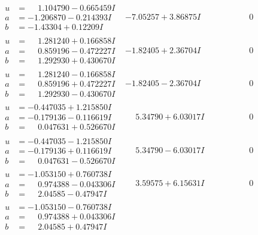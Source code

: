 \documentclass[1p]{elsarticle_modified}
\theoremstyle{definition}
\begin{document}
$$\begin{array}{c|c|c}
\begin{aligned}
u &= \phantom{-}1.104790 - 0.665459 I \\
a &= -1.206870 - 0.214393 I \\
b &= -1.43304 + 0.12209 I\end{aligned}
 & -7.05257 + 3.86875 I & \phantom{-0.000000 } 0 \\ \hline\begin{aligned}
u &= \phantom{-}1.281240 + 0.166858 I \\
a &= \phantom{-}0.859196 - 0.472227 I \\
b &= \phantom{-}1.292930 + 0.430670 I\end{aligned}
 & -1.82405 + 2.36704 I & \phantom{-0.000000 } 0 \\ \hline\begin{aligned}
u &= \phantom{-}1.281240 - 0.166858 I \\
a &= \phantom{-}0.859196 + 0.472227 I \\
b &= \phantom{-}1.292930 - 0.430670 I\end{aligned}
 & -1.82405 - 2.36704 I & \phantom{-0.000000 } 0 \\ \hline\begin{aligned}
u &= -0.447035 + 1.215850 I \\
a &= -0.179136 - 0.116619 I \\
b &= \phantom{-}0.047631 + 0.526670 I\end{aligned}
 & \phantom{-}5.34790 + 6.03017 I & \phantom{-0.000000 } 0 \\ \hline\begin{aligned}
u &= -0.447035 - 1.215850 I \\
a &= -0.179136 + 0.116619 I \\
b &= \phantom{-}0.047631 - 0.526670 I\end{aligned}
 & \phantom{-}5.34790 - 6.03017 I & \phantom{-0.000000 } 0 \\ \hline\begin{aligned}
u &= -1.053150 + 0.760738 I \\
a &= \phantom{-}0.974388 - 0.043306 I \\
b &= \phantom{-}2.04585 - 0.47947 I\end{aligned}
 & \phantom{-}3.59575 + 6.15631 I & \phantom{-0.000000 } 0 \\ \hline\begin{aligned}
u &= -1.053150 - 0.760738 I \\
a &= \phantom{-}0.974388 + 0.043306 I \\
b &= \phantom{-}2.04585 + 0.47947 I\end{aligned}

\end{array}$$
\end{document}
